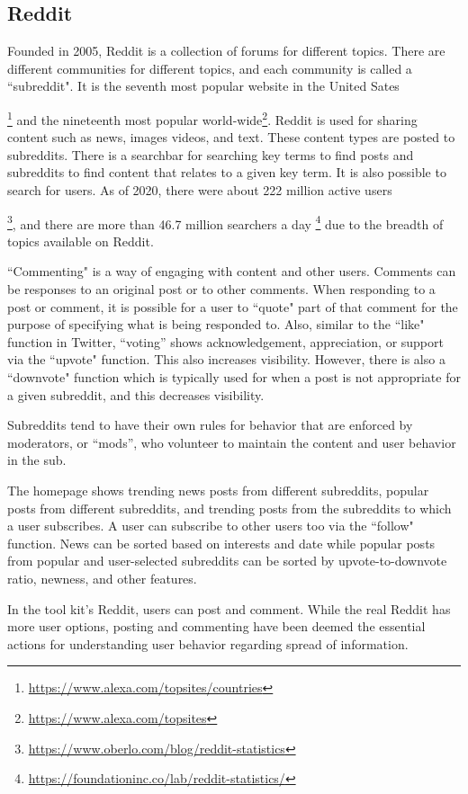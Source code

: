 \subsection{Reddit}
Founded in 2005, Reddit is a collection of forums for different topics. 
There are different communities for different topics, and each community is called a ``subreddit". 
It is the seventh most popular website in the United Sates{\footnote{\href{https://www.alexa.com/topsites/countries}{https://www.alexa.com/topsites/countries}} and the nineteenth most popular world-wide\footnote{\href{https://www.alexa.com/topsites}{https://www.alexa.com/topsites}}. 
Reddit is used for sharing content such as news, images videos, and text. 
These content types are posted to subreddits. 
There is a searchbar for searching key terms to find posts and subreddits to find content that relates to a given key term. It is also possible to search for users.
As of 2020, there were about 222 million active users{\footnote{\href{https://www.oberlo.com/blog/reddit-statistics}{https://www.oberlo.com/blog/reddit-statistics}}, and there are more than 46.7 million searchers a day \footnote{\href{https://foundationinc.co/lab/reddit-statistics/}{https://foundationinc.co/lab/reddit-statistics/}} due to the breadth of topics available on Reddit.
 \par ``Commenting" is a way of engaging with content and other users.
Comments can be responses to an original post or to other comments. When responding to a post or comment, it is possible for a user to ``quote" part of that comment for the purpose of specifying what is being responded to.
Also, similar to the ``like" function in Twitter, ``voting'' shows acknowledgement, appreciation, or support  via the ``upvote" function. 
This also increases visibility. 
However, there is also a ``downvote" function which is typically used  for when a post is not appropriate for a given subreddit, and this decreases visibility.
\par Subreddits tend to have their own rules for behavior that are enforced by moderators, or ``mods'', who volunteer to maintain the content and user behavior in the sub.
\par The homepage shows trending news posts from different subreddits, popular posts from different subreddits, and trending posts from the subreddits to which a user subscribes. A user can subscribe to other users too via the ``follow" function.
News can be sorted based on interests and date while popular posts from popular and user-selected subreddits can be sorted by upvote-to-downvote ratio, newness, and other features.
\par In the \rhpc tool kit's Reddit, users can post and comment. 
While the real Reddit has more user options, posting and commenting have been deemed the essential actions for understanding user behavior regarding spread of information. 

}}
